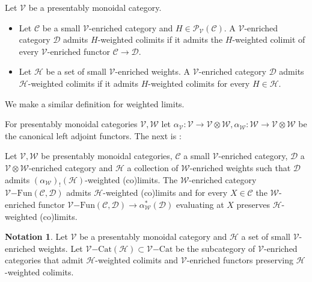 \documentclass[10pt,oneside]{article}
\numberwithin{equation}{section} %
\numberwithin{figure}{section} %
\theoremstyle{plain}
\theoremstyle{definition}
\newtheorem{notation}[thm]{Notation}
\newcommand{\mC}{{\mathcal C}}
\newcommand{\mD}{{\mathcal D}}
\newcommand{\mH}{{\mathcal H}}
\newcommand{\mP}{{\mathcal P}}
\newcommand{\mV}{{\mathcal V}}
\newcommand{\mW}{{\mathcal W}}
\newcommand{\ot}{\otimes}
\newcommand{\Cat}{\mathrm{Cat}}
\newcommand{\Fun}{\mathrm{Fun}}
\begin{document}
\begin{definition}
Let $\mV$ be a presentably monoidal category.

\begin{itemize}

\item Let $\mC$ be a small $\mV$-enriched category and $H \in \mP_\mV(\mC).$ A $\mV$-enriched category $\mD$ admits $H$-weighted colimits if it admits the $H$-weighted colimit of every $\mV$-enriched functor $\mC \to \mD.$

\item Let $\mH$ be a set of small $\mV$-enriched weights. 
A $\mV$-enriched category $\mD$ admits $\mH$-weighted colimits if it admits $H$-weighted colimits for every $H \in \mH.$ 
  
\end{itemize}

\end{definition}

We make a similar definition for weighted limits.

\vspace{1mm}

For presentably monoidal categories $\mV, \mW$ let 
$\alpha_\mV: \mV \to \mV \ot \mW, \alpha_\mW: \mW \to \mV \ot \mW$ be the canonical left adjoint functors.
The next is \cite[Theorem 3.102.]{heine2024higher}:

\begin{proposition}\label{colimenrfun}
Let $\mV, \mW $ be presentably monoidal categories, $\mC$ a small $\mV$-enriched category, $\mD$ a $\mV \ot \mW$-enriched category
and $\mH$ a collection of $\mW$-enriched weights such that $\mD$ admits
$(\alpha_\mW)_!(\mH)$-weighted (co)limits.
The $\mW$-enriched category ${\mV\mathrm{-}\Fun}(\mC,\mD) $
admits $\mH$-weighted (co)limits and for every $X \in \mC$
the $\mW$-enriched functor ${\mV\mathrm{-}\Fun}(\mC,\mD) \to \alpha^*_\mW(\mD) $ evaluating at $X$ preserves $\mH$-weighted (co)limits.
    
\end{proposition}

\begin{notation}
    
Let $\mV$ be a presentably monoidal category and $\mH$ a set of small $\mV$-enriched weights. Let $\mV \mathrm{-}\Cat(\mH) \subset \mV \mathrm{-}\Cat$ be the subcategory of $\mV$-enriched categories that admit $\mH$-weighted colimits and $\mV$-enriched functors preserving $\mH$-weighted colimits.
    
\end{notation}
\end{document}
